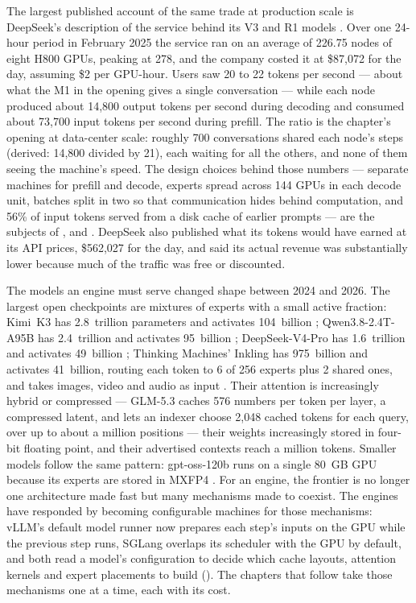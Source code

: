 The largest published account of the same trade at production scale is
DeepSeek's description of the service behind its V3 and R1 models
\cite{deepseek2025inference}. Over one 24-hour period in February 2025 the service
ran on an average of 226.75 nodes of eight H800 GPUs, peaking at 278, and the
company costed it at \$87,072 for the day, assuming \$2 per GPU-hour. Users saw
20 to 22 tokens per second --- about what the M1 in the opening gives a single
conversation --- while each node produced about 14,800 output tokens per second
during decoding and consumed about 73,700 input tokens per second during
prefill. The ratio is the chapter's opening at data-center scale: roughly 700
conversations shared each node's steps (derived: 14,800 divided by 21), each
waiting for all the others, and none of them seeing the machine's speed. The
design choices behind those numbers --- separate machines for prefill and
decode, experts spread across 144 GPUs in each decode unit, batches split in two
so that communication hides behind computation, and 56\% of input tokens served
from a disk cache of earlier prompts --- are the subjects of
,  and
. DeepSeek also published what its tokens would have
earned at its API prices, \$562,027 for the day, and said its actual revenue was
substantially lower because much of the traffic was free or discounted.


The models an engine must serve changed shape between 2024 and 2026. The
largest open checkpoints are mixtures of experts with a small active fraction:
Kimi~K3 has 2.8~trillion parameters and activates 104~billion
\cite{moonshot2026kimik3}; Qwen3.8-2.4T-A95B has 2.4~trillion and activates
95~billion \cite{qwen2026qwen38}; DeepSeek-V4-Pro has 1.6~trillion and activates
49~billion \cite{deepseek2026v4}; Thinking Machines' Inkling has 975~billion
and activates 41~billion, routing each token to 6 of 256 experts plus 2 shared
ones, and takes images, video and audio as input \cite{thinkingmachines2026inkling}.
Their attention is increasingly hybrid or compressed --- GLM-5.3 caches 576
numbers per token per layer, a compressed latent, and lets an indexer choose
2,048 cached tokens for each query, over up to about a million positions
\cite{zai2026glm53} --- their weights increasingly stored in four-bit floating
point, and their advertised contexts reach a million tokens. Smaller models
follow the same pattern: gpt-oss-120b runs on a single 80~GB GPU because its
experts are stored in MXFP4 \cite{openai2025gptoss}. For an engine, the
frontier is no longer one architecture made fast but many mechanisms made to
coexist. The engines have responded by becoming configurable machines for those
mechanisms: vLLM's default model runner now prepares each step's inputs on the
GPU while the previous step runs, SGLang overlaps its scheduler with the GPU by
default, and both read a model's configuration to decide which cache layouts,
attention kernels and expert placements to build (). The
chapters that follow take those mechanisms one at a time, each with its cost.

